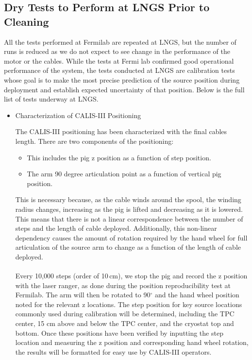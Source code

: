 \subsection{Dry Tests to Perform at LNGS Prior to Cleaning}
All the tests performed at Fermilab are  repeated at LNGS, but the number of runs is reduced as we do not expect to see change in the performance of the motor or the cables. While the tests at Fermi lab confirmed good operational performance of the system, the tests conducted at LNGS are calibration tests whose goal is to make the most precise prediction of the source position during deployment and establish expected uncertainty of that position.  Below is the full list of tests underway at LNGS.

 \begin{itemize}
  \item{Characterization of CALIS-III Positioning} 
 
   The CALIS-III positioning has been characterized with the final cables length. There are two components of the positioning: 

\begin{itemize}
\item
This includes the pig z position as a function of step position.
\item 
The arm 90 degree articulation point as a function of vertical pig position.  
\end{itemize}
This is necessary because, as the cable winds around the spool, the winding radius changes, increasing as the pig is lifted and decreasing as it is lowered.  This means that there is not a linear correspondence between the number of steps and the length of cable deployed.  Additionally, this non-linear dependency causes the amount of rotation required by the hand wheel for full articulation of the source arm to change as a function of the length of cable deployed.     
 
  \paragraph{}
  Every 10,000 steps (order of 10\,cm), we stop the pig and record the z position with the laser ranger, as done during the position reproducibility test at Fermilab.  The arm will then be rotated to 90$^{\circ}$ and the hand wheel position noted for the relevant z locations. The step position for key source locations commonly used during calibration will be determined, including the TPC center, 15 cm above and below the TPC center, and the cryostat top and bottom.  Once these positions have been verified by inputting the step location and measuring the z position and corresponding hand wheel rotation, the results will be formatted for easy use by CALIS-III operators.   
  

\end{itemize}
